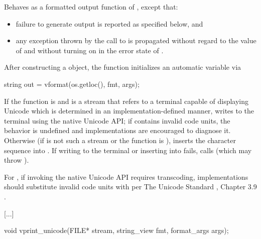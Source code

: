 \documentclass{wg21}
\begin{document}
\begin{itemdescr}
    \pnum
    \effects
    Behaves as a formatted output function
    of , except that:
    \begin{itemize}
        \item
        failure to generate output is reported as specified below, and
        \item
        any exception thrown by the call to  is propagated
        without regard to the value of  and
        without turning on  in the error state of .
    \end{itemize}
    After constructing a  object,
    the function initializes an automatic variable via
    \begin{codeblock}
        string out = vformat(os.getloc(), fmt, args);
    \end{codeblock}
    If the function is  and
     is a stream that refers to a terminal capable of displaying Unicode
    which is determined in an implementation-defined manner,
    writes  to the terminal using the native Unicode API;
    if  contains invalid code units,
    the behavior is undefined and
    implementations are encouraged to diagnose it.
    Otherwise (if  is not such a stream or
    the function is ),
    inserts the character sequence
     into .
    If writing to the terminal or inserting into  fails,
    calls 
    (which may throw ).

    \pnum
    \recommended
    For ,
    if invoking the native Unicode API requires transcoding,
    implementations should substitute invalid code units
    with  per
    The Unicode Standard , Chapter 3.9 .
\end{itemdescr}

\textcolor{noteclr}{[...]}

%
\begin{itemdecl}
    void vprint_unicode(FILE* stream, string_view fmt, format_args args);
\end{itemdecl}
\end{document}
